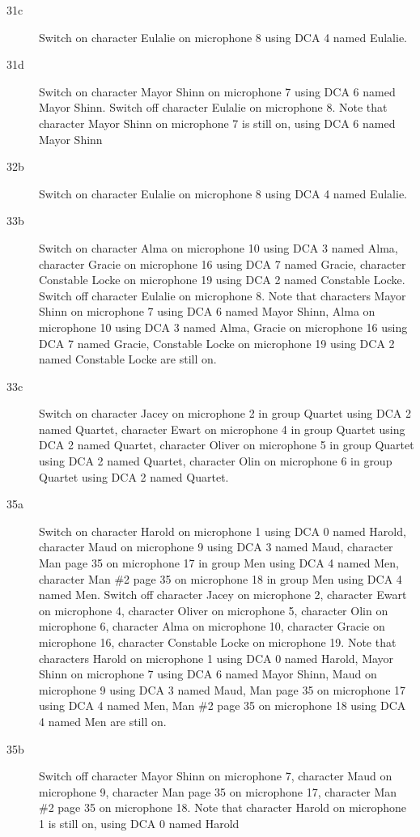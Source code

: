 \begin{description}
\item[31c]
Switch on character Eulalie on microphone 8 using DCA 4 named Eulalie. 

\item[31d]
Switch on character Mayor Shinn on microphone 7 using DCA 6 named Mayor Shinn. Switch off character Eulalie on microphone 8. Note that character Mayor Shinn on microphone 7 is still on, using DCA 6 named Mayor Shinn

\item[32b]
Switch on character Eulalie on microphone 8 using DCA 4 named Eulalie. 

\item[33b]
Switch on character Alma on microphone 10 using DCA 3 named Alma, character Gracie on microphone 16 using DCA 7 named Gracie, character Constable Locke on microphone 19 using DCA 2 named Constable Locke. Switch off character Eulalie on microphone 8. Note that characters Mayor Shinn on microphone 7 using DCA 6 named Mayor Shinn, Alma on microphone 10 using DCA 3 named Alma, Gracie on microphone 16 using DCA 7 named Gracie, Constable Locke on microphone 19 using DCA 2 named Constable Locke are still on.  

\item[33c]
Switch on character Jacey on microphone 2 in group Quartet using DCA 2 named Quartet, character Ewart on microphone 4 in group Quartet using DCA 2 named Quartet, character Oliver on microphone 5 in group Quartet using DCA 2 named Quartet, character Olin on microphone 6 in group Quartet using DCA 2 named Quartet. 

\item[35a]
Switch on character Harold on microphone 1 using DCA 0 named Harold, character Maud on microphone 9 using DCA 3 named Maud, character Man page 35 on microphone 17 in group Men using DCA 4 named Men, character Man \#2 page 35 on microphone 18 in group Men using DCA 4 named Men. Switch off character Jacey on microphone 2, character Ewart on microphone 4, character Oliver on microphone 5, character Olin on microphone 6, character Alma on microphone 10, character Gracie on microphone 16, character Constable Locke on microphone 19. Note that characters Harold on microphone 1 using DCA 0 named Harold, Mayor Shinn on microphone 7 using DCA 6 named Mayor Shinn, Maud on microphone 9 using DCA 3 named Maud, Man page 35 on microphone 17 using DCA 4 named Men, Man \#2 page 35 on microphone 18 using DCA 4 named Men are still on.  

\item[35b]
Switch off character Mayor Shinn on microphone 7, character Maud on microphone 9, character Man page 35 on microphone 17, character Man \#2 page 35 on microphone 18. Note that character Harold on microphone 1 is still on, using DCA 0 named Harold


\end{description}
